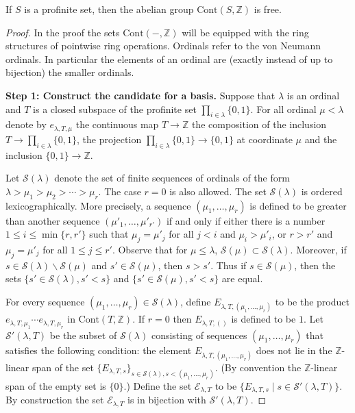 \begin{theorem}
\label{profinite:noebeling}
If $ S $ is a profinite set, then the abelian group $ \mathrm{Cont}(S, \mathbb{Z}) $ is free.
\end{theorem}

\begin{proof}
In the proof the sets $ \mathrm{Cont}(-, \mathbb{Z}) $ will be equipped with the ring structures of pointwise ring operations.
Ordinals refer to the von Neumann ordinals. In particular the elements of an ordinal are (exactly instead of up to bijection) the smaller ordinals.

\textbf{Step 1: Construct the candidate for a basis.}
Suppose that $ \lambda $ is an ordinal and $ T $ is a closed subspace of the profinite set
$ \prod _{i\in \lambda} \{0, 1\} $.
For all ordinal $ \mu < \lambda $ denote by $ e _{\lambda, T, \mu} $ the continuous map $ T\to \mathbb{Z} $
the composition of the inclusion $ T\to \prod _{i\in \lambda} \{0, 1\} $,
the projection $ \prod _{i\in \lambda} \{0, 1\} \to \{0, 1\} $ at coordinate $ \mu $
and the inclusion $ \{0, 1\}\to \mathbb{Z} $.

Let $ \mathcal{S}(\lambda) $ denote the set of finite sequences of ordinals of the form
$ \lambda > \mu _{1} > \mu _{2} > \cdots > \mu _{r} $. The case $ r = 0 $ is also allowed.
The set $ \mathcal{S}(\lambda) $ is ordered lexicographically. More precisely,
a sequence $ (\mu _{1}, \ldots, \mu _{r}) $ is defined to be greater than another sequence $ (\mu' _{1}, \ldots, \mu'_{r'}) $
if and only if either there is a number $ 1\leq i\leq \min \{r, r'\}$ such that $ \mu _{j} = \mu'_{j} $ for all $ j < i $
and $ \mu _{i} > \mu'_{i} $, or $ r>r' $ and $ \mu _{j} = \mu'_{j} $ for all $ 1\leq j\leq r' $.
Observe that
for $ \mu \leq \lambda $, $ \mathcal{S}(\mu)\subset \mathcal{S}(\lambda) $.
Moreover, if $ s\in \mathcal{S}(\lambda) \backslash \mathcal{S}(\mu) $ and
$ s'\in \mathcal{S}(\mu) $, then $ s > s' $.
Thus if $ s\in \mathcal{S}(\mu) $, then the sets $ \{s'\in \mathcal{S}(\lambda), s' < s\} $
and $ \{s'\in \mathcal{S}(\mu), s'<s\} $ are equal.

For every sequence $ (\mu _{1}, \ldots, \mu _{r})\in \mathcal{S}(\lambda) $, define
$ E _{\lambda, T, (\mu _{1}, \ldots, \mu _{r})} $ to be the product
$ e _{\lambda, T, \mu _{1}}\cdots e _{\lambda, T, \mu _{r}} $ in $ \mathrm{Cont}(T, \mathbb{Z}) $.
If $ r = 0 $ then $ E _{\lambda, T, ()} $ is defined to be $ 1 $.
Let $ \mathcal{S}'(\lambda, T) $ be the subset of $ \mathcal{S}(\lambda) $ consisting of
sequences $ (\mu _{1}, \ldots, \mu _{r}) $ that satisfies the following condition:
the element $ E _{\lambda, T, (\mu _{1}, \ldots, \mu _{r})} $ does not lie in the $ \mathbb{Z} $-linear span of the set
$ \{E _{\lambda, T, s}\}_{s\in \mathcal{S}(\lambda), s < (\mu _{1}, \ldots, \mu _{r})} $.
(By convention the $ \mathbb{Z} $-linear span of the empty set is $ \{0\} $.)
Define the set $ \mathscr{E}_{\lambda, T} $ to be $ \{E _{\lambda, T, s} \mid s\in \mathcal{S}'(\lambda, T)\} $.
By construction the set $ \mathscr{E}_{\lambda, T} $ is in bijection with $ \mathcal{S}'(\lambda, T) $.


\end{proof}

